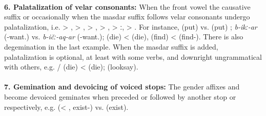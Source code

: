 \\
\textbf{6. Palatalization of velar consonants:} When the front vowel  the causative suffix  or occasionally when the masdar suffix  follows velar consonants undergo palatalization, i.e.  > , > ,  > ,  > ,  > ː,  > . For instance,  (put)  vs.  (put) ; \textit{b-ikː-ar} (-want.) vs. \textit{b-ičː-aq-ar} (-want.);  (die) <  (die),  (find) <  (find-). There is also degemination in the last example. When the masdar suffix is added, palatalization is optional, at least with some verbs, and downright ungrammatical with others, e.g.  /  (die) <  (die);  (looksay).\\
\\
\textbf{7. Gemination and devoicing of voiced stops:} The gender affixes  and  become devoiced geminates when preceded or followed by another stop  or  respectively, e.g.  (< , exist-) vs.  (exist).



%
%
